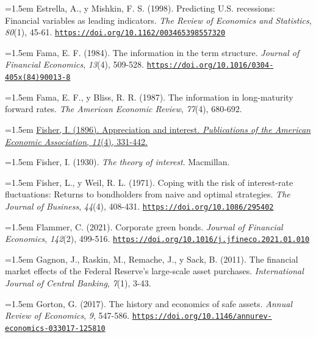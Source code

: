 \documentclass[10pt,a4paper]{article}
\begin{document}
\noindent\hangindent=1.5em Estrella, A., y Mishkin, F. S. (1998). Predicting U.S. recessions: Financial variables as leading indicators. \textit{The Review of Economics and Statistics}, \textit{80}(1), 45-61. \href{https://doi.org/10.1162/003465398557320}{\nolinkurl{https://doi.org/10.1162/003465398557320}}

\noindent\hangindent=1.5em Fama, E. F. (1984). The information in the term structure. \textit{Journal of Financial Economics}, \textit{13}(4), 509-528. \href{https://doi.org/10.1016/0304-405x(84)90013-8}{\nolinkurl{https://doi.org/10.1016/0304-405x(84)90013-8}}

\noindent\hangindent=1.5em Fama, E. F., y Bliss, R. R. (1987). The information in long-maturity forward rates. \textit{The American Economic Review}, \textit{77}(4), 680-692.

\noindent\hangindent=1.5em \href{https://fraser.stlouisfed.org/title/appreciation-interest-3609}{Fisher, I. (1896). Appreciation and interest. \textit{Publications of the American Economic Association}, \textit{11}(4), 331-442.}

\noindent\hangindent=1.5em Fisher, I. (1930). \textit{The theory of interest}. Macmillan.

\noindent\hangindent=1.5em Fisher, L., y Weil, R. L. (1971). Coping with the risk of interest-rate fluctuations: Returns to bondholders from naive and optimal strategies. \textit{The Journal of Business}, \textit{44}(4), 408-431. \href{https://doi.org/10.1086/295402}{\nolinkurl{https://doi.org/10.1086/295402}}

\noindent\hangindent=1.5em Flammer, C. (2021). Corporate green bonds. \textit{Journal of Financial Economics}, \textit{142}(2), 499-516. \href{https://doi.org/10.1016/j.jfineco.2021.01.010}{\nolinkurl{https://doi.org/10.1016/j.jfineco.2021.01.010}}

\noindent\hangindent=1.5em Gagnon, J., Raskin, M., Remache, J., y Sack, B. (2011). The financial market effects of the Federal Reserve's large-scale asset purchases. \textit{International Journal of Central Banking}, \textit{7}(1), 3-43.

\noindent\hangindent=1.5em Gorton, G. (2017). The history and economics of safe assets. \textit{Annual Review of Economics}, \textit{9}, 547-586. \href{https://doi.org/10.1146/annurev-economics-033017-125810}{\nolinkurl{https://doi.org/10.1146/annurev-economics-033017-125810}}
\end{document}
